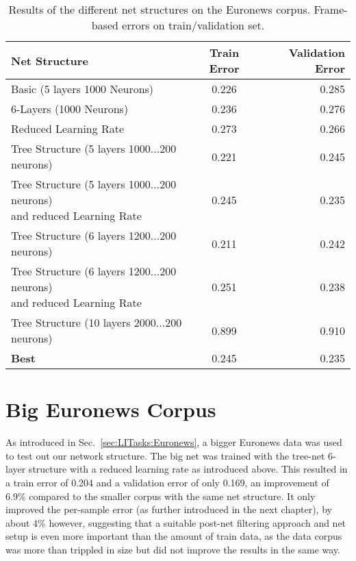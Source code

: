 \begin{table}[h!]
\label{tab:resFrameBased}
\centering
\begin{tabular}{| l | c | r | }
	\hline
	\textbf{Net Structure} & \textbf{Train Error} & \textbf{Validation Error}  \\
	\hline
	Basic (5 layers 1000 Neurons) & 0.226 &  0.285 \\
	\hline
	6-Layers (1000 Neurons) & 0.236 & 0.276 \\
	\hline
	Reduced Learning Rate & 0.273 & 0.266 \\ 
	\hline
	Tree Structure (5 layers 1000...200 neurons) & 0.221 & 0.245 \\
	\hline
	\parbox[t]{5cm}{Tree Structure (5 layers 1000...200 neurons)\\and reduced Learning Rate} & 0.245 & 0.235 \\
	\hline
	Tree Structure (6 layers 1200...200 neurons) & 0.211 & 0.242 \\
	\hline
	\parbox[t]{5cm}{Tree Structure (6 layers 1200...200 neurons) \\
	and reduced Learning Rate} & 0.251 & 0.238 \\
	\hline
	Tree Structure (10 layers 2000...200 neurons) & 0.899 & 0.910 \\
	\hline
	\textbf{Best} & 0.245 & 0.235 \\
	\hline
\end{tabular}
\caption{Results of the different net structures on the Euronews corpus. Frame-based errors on train/validation set.}
\end{table}

\section{Big Euronews Corpus}
\label{sec:IDNetworkBig}

As introduced in Sec.~\ref{sec:LITasks:Euronews}, a bigger Euronews data was used to test out our network structure. The big net was trained with the tree-net 6-layer structure with a reduced learning rate as introduced above. This resulted in a train error of 0.204 and a validation error of only 0.169, an improvement of 6.9\% compared to the smaller corpus with the same net structure. It only improved the per-sample error (as further introduced in the next chapter), by about 4\% however, suggesting that a suitable post-net filtering approach and net setup is even more important than the amount of train data, as the data corpus was more than trippled in size but did not improve the results in the same way.

